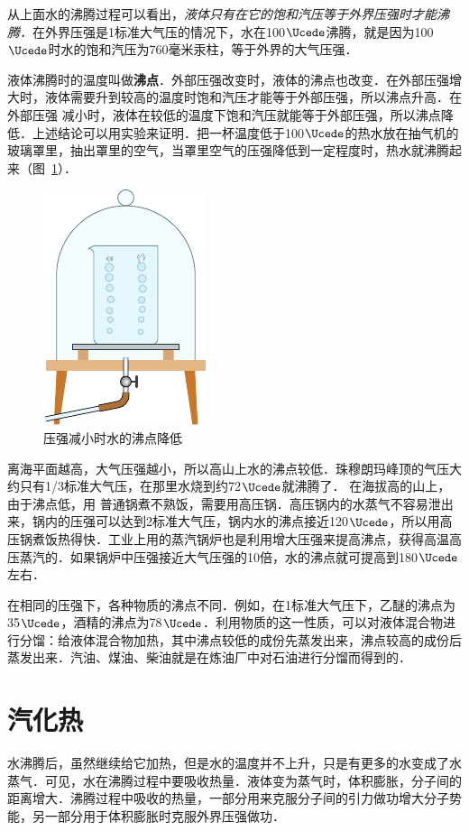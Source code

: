 从上面水的沸腾过程可以看出，\textit{液体只有在它的饱和汽压等于外界压强时才能沸腾．}在外界压强是1标准大气压的情况下，水在100$\Ucede$沸腾，就是因为100$\Ucede$时水的饱和汽压为760毫米汞柱，等于外界的大气压强．

液体沸腾时的温度叫做\textbf{沸点}．外部压强改变时，液体的沸点也改变．在外部压强增大时，液体需要升到较高的温度时饱和汽压才能等于外部压强，所以沸点升高．在外部压强
减小时，液体在较低的温度下饱和汽压就能等于外部压强，所以沸点降低．上述结论可以用实验来证明．把一杯温度低于100$\Ucede$的热水放在抽气机的玻璃罩里，抽出罩里的空气，当罩里空气的压强降低到一定程度时，热水就沸腾起来（图~\ref{fig_B_5-7}）．
\begin{figure}[htbp]
  \centering
  \includegraphics{fig/B/5-7.pdf}
  \caption{压强减小时水的沸点降低}\label{fig_B_5-7}
\end{figure}

离海平面越高，大气压强越小，所以高山上水的沸点较低．珠穆朗玛峰顶的气压大约只有1/3标准大气压，在那里水烧到约72$\Ucede$就沸腾了．
在海拔高的山上，由于沸点低，用
普通锅煮不熟饭，需要用高压锅．高压锅内的水蒸气不容易泄出来，锅内的压强可以达到2标准大气压，锅内水的沸点接近120$\Ucede$，所以用高压锅煮饭热得快．工业上用的蒸汽锅炉也是利用增大压强来提高沸点，获得高温高压蒸汽的．如果锅炉中压强接近大气压强的10倍，水的沸点就可提高到180$\Ucede$左右．

在相同的压强下，各种物质的沸点不同．例如，在1标准大气压下，乙醚的沸点为35$\Ucede$，酒精的沸点为78$\Ucede$．利用物质的这一性质，可以对液体混合物进行分馏：给液体混合物加热，其中沸点较低的成份先蒸发出来，沸点较高的成份后蒸发出来．汽油、煤油、柴油就是在炼油厂中对石油进行分馏而得到的．

\section{汽化热}
水沸腾后，虽然继续给它加热，但是水的温度并不上升，只是有更多的水变成了水蒸气．可见，水在沸腾过程中要吸收热量．液体变为蒸气时，体积膨胀，分子间的距离增大．沸腾过程中吸收的热量，一部分用来克服分子间的引力做功增大分子势能，另一部分用于体积膨胀时克服外界压强做功．

